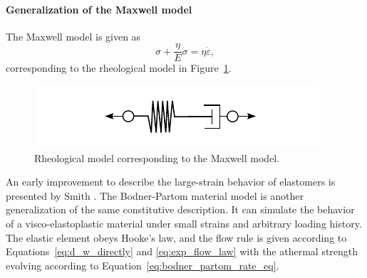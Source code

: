 \paragraph{Generalization of the Maxwell model}
The Maxwell model is given as
\begin{equation}
	\sigma + \frac{\eta}{E}\dot \sigma = \eta \dot \varepsilon,
\end{equation}
corresponding to the rheological model in Figure~\ref{fig:rheo_model_maxwell}.
\begin{figure}[hbtp]
	\centering
	\includegraphics{figures/rheo_model_maxwell}
	\caption{Rheological model corresponding to the Maxwell model.}
\label{fig:rheo_model_maxwell}
\end{figure}
An early improvement to describe the large-strain behavior of elastomers is presented by Smith \citep{smithNonlinearViscoelasticResponse1962}.
The Bodner-Partom material model \citep{bodnerConstitutiveEquationsElasticViscoplastic1975} is another generalization of the same constitutive description.
It can simulate the behavior of a visco-elastoplastic material under small strains and arbitrary loading history.
The elastic element obeys Hooke's law, and the flow rule is given according to Equations~\eqref{eq:d_w_directly} and \eqref{eq:exp_flow_law} with the athermal strength evolving according to Equation~\eqref{eq:bodner_partom_rate_eq}.
